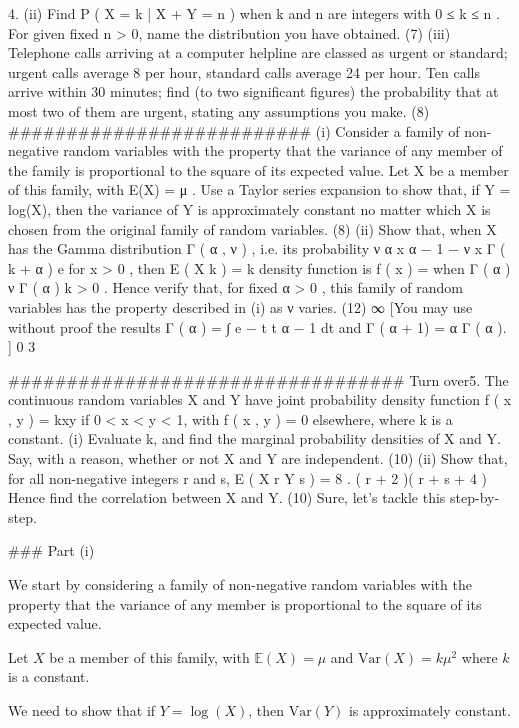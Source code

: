 4.
(ii) Find P ( X = k | X + Y = n ) when k and n are integers with 0 ≤ k ≤ n . For
given fixed n > 0, name the distribution you have obtained.
(7)
(iii) Telephone calls arriving at a computer helpline are classed as urgent or
standard; urgent calls average 8 per hour, standard calls average 24 per hour.
Ten calls arrive within 30 minutes; find (to two significant figures) the
probability that at most two of them are urgent, stating any assumptions you
make.
(8)
##########################
(i) Consider a family of non-negative random variables with the property that the
variance of any member of the family is proportional to the square of its
expected value. Let X be a member of this family, with E(X) = μ . Use a
Taylor series expansion to show that, if Y = log(X), then the variance of Y is
approximately constant no matter which X is chosen from the original family
of random variables.
(8)
(ii) Show that, when X has the Gamma distribution Γ ( α , ν ) , i.e. its probability
ν α x α − 1 − ν x
Γ ( k + α )
e for x > 0 , then E ( X k ) = k
density function is f ( x ) =
when
Γ ( α )
ν Γ ( α )
k > 0 . Hence verify that, for fixed α > 0 , this family of random variables has
the property described in (i) as ν varies.
(12)
∞
[You may use without proof the results Γ ( α ) = ∫ e − t t α − 1 dt and Γ ( α + 1) = α Γ ( α ). ]
0
3

##################################
Turn over5.
The continuous random variables X and Y have joint probability density function
f ( x , y ) = kxy if 0 < x < y < 1, with f ( x , y ) = 0 elsewhere, where k is a constant.
(i) Evaluate k, and find the marginal probability densities of X and Y. Say, with a
reason, whether or not X and Y are independent.
(10)
(ii) Show that, for all non-negative integers r and s, E ( X r Y s ) =
8
.
( r + 2 )( r + s + 4 )
Hence find the correlation between X and Y.
(10)
Sure, let's tackle this step-by-step.

### Part (i)

We start by considering a family of non-negative random variables with the property that the variance of any member is proportional to the square of its expected value.

Let \( X \) be a member of this family, with \( \mathbb{E}(X) = \mu \) and \( \text{Var}(X) = k\mu^2 \) where \( k \) is a constant.

We need to show that if \( Y = \log(X) \), then \( \text{Var}(Y) \) is approximately constant.

